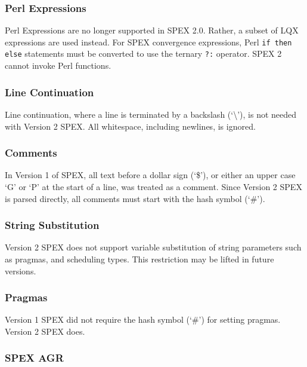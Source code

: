 \subsubsection{Perl Expressions}

Perl Expressions are no longer supported in SPEX 2.0.  Rather, a subset of
LQX expressions are used instead.  For SPEX convergence
expressions, Perl \texttt{if then else} statements must be
converted to use the ternary \texttt{?:}
operator.  SPEX 2 cannot invoke Perl functions.

\subsubsection{Line Continuation}

Line continuation, where a line is terminated by a backslash (`\textbackslash')\index{\textbackslash}, is not needed
with Version 2 SPEX.  All whitespace, including newlines, is ignored.

\subsubsection{Comments}

In Version 1 of SPEX, all text before a dollar sign (`\$'), or either an upper case `G' or `P' at the start
of a line, was treated as a comment.  Since Version 2 SPEX is parsed directly, all comments must start with
the hash symbol (`\#')\index{\#}.

\subsubsection{String Substitution}

Version 2 SPEX does not support variable substitution of string parameters such as pragmas, and scheduling
types.  This restriction may be lifted in future versions.

\subsubsection{Pragmas}

Version 1 SPEX did not require the hash symbol (`\#')\index{\#} for setting pragmas.  Version 2 SPEX does.

\subsubsection{SPEX AGR}

